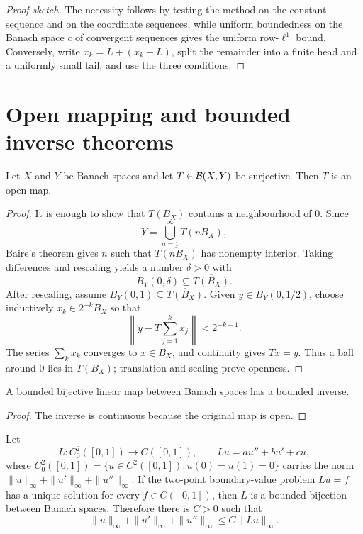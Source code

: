 \begin{proof}[Proof sketch]
The necessity follows by testing the method on the constant sequence and on
the coordinate sequences, while uniform boundedness on the Banach space $c$
of convergent sequences gives the uniform row-$\ell^1$ bound.  Conversely,
write $x_k=L+(x_k-L)$, split the remainder into a finite head and a uniformly
small tail, and use the three conditions.
\end{proof}

\section{Open mapping and bounded inverse theorems}

\begin{notetheorem}
Let $X$ and $Y$ be Banach spaces and let $T\in\mathcal{B}(X,Y)$ be surjective.
Then $T$ is an open map.
\end{notetheorem}

\begin{proof}
It is enough to show that $T(B_X)$ contains a neighbourhood of $0$.  Since
\[
  Y=\bigcup_{n=1}^{\infty}T(nB_X),
\]
Baire's theorem gives $n$ such that $\overline{T(nB_X)}$ has nonempty
interior.  Taking differences and rescaling yields a number $\delta>0$ with
\[
  B_Y(0,\delta)\subseteq\overline{T(B_X)}.
\]
After rescaling, assume $B_Y(0,1)\subseteq\overline{T(B_X)}$.  Given
$y\in B_Y(0,1/2)$, choose inductively $x_k\in2^{-k}B_X$ so that
\[
  \left\|y-T\sum_{j=1}^{k}x_j\right\|<2^{-k-1}.
\]
The series $\sum_kx_k$ converges to $x\in B_X$, and continuity gives
$Tx=y$.  Thus a ball around $0$ lies in $T(B_X)$; translation and scaling
prove openness.
\end{proof}

\begin{notecorollary}
A bounded bijective linear map between Banach spaces has a bounded inverse.
\end{notecorollary}

\begin{proof}
The inverse is continuous because the original map is open.
\end{proof}

\begin{noteexample}
Let
\[
  L\colon C^2_0([0,1])\to C([0,1]),
  \qquad
  Lu=a u''+b u'+cu,
\]
where $C^2_0([0,1])=\{u\in C^2([0,1]):u(0)=u(1)=0\}$ carries the norm
$\|u\|_\infty+\|u'\|_\infty+\|u''\|_\infty$.  If the two-point
boundary-value problem $Lu=f$ has a unique solution for every
$f\in C([0,1])$, then $L$ is a bounded bijection between Banach spaces.
Therefore there is $C>0$ such that
\[
  \|u\|_\infty+\|u'\|_\infty+\|u''\|_\infty
  \le C\|Lu\|_\infty.
\]
\end{noteexample}


